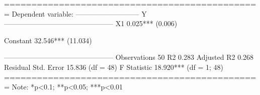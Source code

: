 
===============================================
                        Dependent variable:    
                    ---------------------------
                                 Y             
-----------------------------------------------
X1                           0.025***          
                              (0.006)          
                                               
Constant                     32.546***         
                             (11.034)          
                                               
-----------------------------------------------
Observations                    50             
R2                             0.283           
Adjusted R2                    0.268           
Residual Std. Error      15.836 (df = 48)      
F Statistic           18.920*** (df = 1; 48)   
===============================================
Note:               *p<0.1; **p<0.05; ***p<0.01
